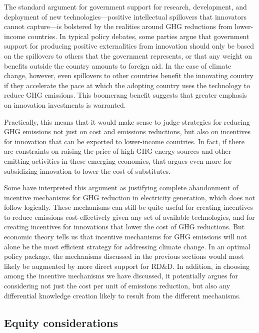 \documentclass[12pt]{article}
\begin{document}
The standard argument for government support for research, development, and deployment of new technologies---positive intellectual spillovers that innovators cannot capture---is bolstered by the realities around GHG reductions from lower-income countries.  In typical policy debates, some parties argue that government support for producing positive externalities from innovation should only be based on the spillovers to others that the government represents, or that any weight on benefits outside the country amounts to foreign aid. In the case of climate change, however, even spillovers to other countries benefit the innovating country if they accelerate the pace at which the adopting country uses the technology to reduce GHG emissions.  This boomerang benefit suggests that greater emphasis on innovation investments is warranted.

Practically, this means that it would make sense to judge strategies for reducing GHG emissions not just on cost and emissions reductions, but also on incentives for innovation that can be exported to lower-income countries. In fact, if there are constraints on raising the price of high-GHG energy sources and other emitting activities in these emerging economies, that argues even more for subsidizing innovation to lower the cost of substitutes.

Some have interpreted this argument as justifying complete abandonment of incentive mechanisms for GHG reduction in electricity generation, which does not follow logically. These mechanisms can still be quite useful for creating incentives to reduce emissions cost-effectively given any set of available technologies, and for creating incentives for innovations that lower the cost of GHG reductions. But economic theory tells us that incentive mechanisms for GHG emissions will not alone be the most efficient strategy for addressing climate change.  In an optimal policy package, the mechanisms discussed in the previous sections would most likely be augmented by more direct support for RD\&D. In addition, in choosing among the incentive mechanisms we have discussed, it potentially argues for considering not just the cost per unit of emissions reduction, but also any differential knowledge creation likely to result from the different mechanisms.


\subsection{Equity considerations}
\end{document}
